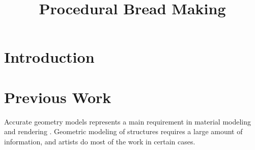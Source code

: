\documentclass[final,5p,times]{elsarticle}
\begin{document}
\begin{frontmatter}



\title{Procedural Bread Making}


\author{}

\address{}

\begin{abstract}

\end{abstract}

\begin{keyword}


\end{keyword}

\end{frontmatter}

\linenumbers

\section{Introduction}


\section{Previous Work}
Accurate geometry models represents a main requirement in material modeling and rendering \cite{Dorsey2007}. Geometric modeling of structures requires a large amount of information, and artists do most of the work in certain cases.
\end{document}
